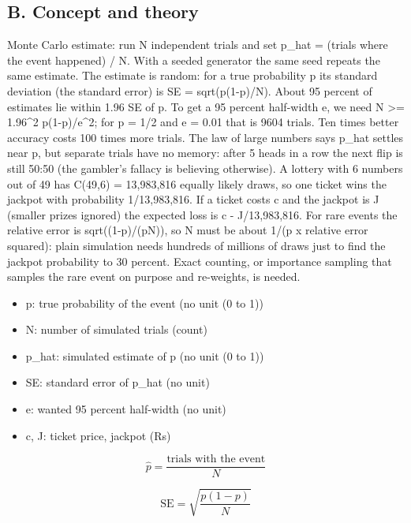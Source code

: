 \documentclass[11pt,a4paper]{article}
\begin{document}
\subsection*{B. Concept and theory}
Monte Carlo estimate: run N independent trials and set p\_hat = (trials where the event happened) / N. With a seeded generator the same seed repeats the same estimate. The estimate is random: for a true probability p its standard deviation (the standard error) is SE = sqrt(p(1-p)/N). About 95 percent of estimates lie within 1.96 SE of p. To get a 95 percent half-width e, we need N \textgreater{}= 1.96\textasciicircum{}2 p(1-p)/e\textasciicircum{}2; for p = 1/2 and e = 0.01 that is 9604 trials. Ten times better accuracy costs 100 times more trials. The law of large numbers says p\_hat settles near p, but separate trials have no memory: after 5 heads in a row the next flip is still 50:50 (the gambler's fallacy is believing otherwise). A lottery with 6 numbers out of 49 has C(49,6) = 13,983,816 equally likely draws, so one ticket wins the jackpot with probability 1/13,983,816. If a ticket costs c and the jackpot is J (smaller prizes ignored) the expected loss is c - J/13,983,816. For rare events the relative error is sqrt((1-p)/(pN)), so N must be about 1/(p x relative error squared): plain simulation needs hundreds of millions of draws just to find the jackpot probability to 30 percent. Exact counting, or importance sampling that samples the rare event on purpose and re-weights, is needed.

\begin{itemize}[nosep]
\item p: true probability of the event (no unit (0 to 1))
\item N: number of simulated trials (count)
\item p\_hat: simulated estimate of p (no unit (0 to 1))
\item SE: standard error of p\_hat (no unit)
\item e: wanted 95 percent half-width (no unit)
\item c, J: ticket price, jackpot (Rs)
\end{itemize}

\begin{equation*}
\hat p=\dfrac{\text{trials with the event}}{N}
\end{equation*}

\begin{equation*}
\mathrm{SE}=\sqrt{\dfrac{p(1-p)}{N}}
\end{equation*}
\end{document}
